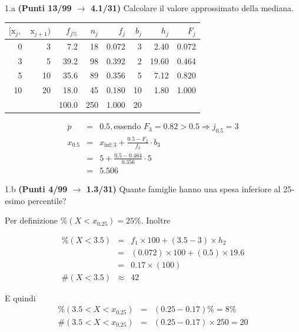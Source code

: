 \documentclass[
  11pt,
]{book}
\theoremstyle{mytheoremstyle}
\theoremstyle{mydefstyle}
\newenvironment{sol}
  {
  \begin{tcolorbox}[enhanced,breakable,arc=0.1mm,boxrule=1pt,colback=white,colframe=iblue,
  title=\bf \fontfamily{lmss}\selectfont \hspace{.5 cm} Soluzione,drop fuzzy shadow]

}{
\end{tcolorbox}
  }
\begin{document}
1.a \textbf{(Punti 13/99 \(\rightarrow\) 4.1/31)} Calcolare il valore approssimato della mediana.

\begin{sol}

\begin{table}[H]
\centering
\begin{tabular}{rrrrrrrr}
\toprule
$[\text{x}_j,$ & $\text{x}_{j+1})$ & $f_{j\%}$ & $n_j$ & $f_j$ & $b_j$ & $h_j$ & $F_j$\\
\midrule
0 & 3 & 7.2 & 18 & 0.072 & 3 & 2.40 & 0.072\\
3 & 5 & 39.2 & 98 & 0.392 & 2 & 19.60 & 0.464\\
5 & 10 & 35.6 & 89 & 0.356 & 5 & 7.12 & 0.820\\
10 & 20 & 18.0 & 45 & 0.180 & 10 & 1.80 & 1.000\\
 &  & 100.0 & 250 & 1.000 & 20 &  & \\
\bottomrule
\end{tabular}
\end{table}

\begin{eqnarray*}
  p &=&  0.5 , \text{essendo }F_{ 3 }= 0.82  > 0.5  \Rightarrow j_{ 0.5 }= 3 \\
  x_{ 0.5 } &=& x_{\text{inf}; 3 } + \frac{ { 0.5 } - F_{ 2 }} {f_{ 3 }} \cdot b_{ 3 } \\
            &=&  5  + \frac {{ 0.5 } -  0.464 } { 0.356 } \cdot  5  \\
            &=&  5.506 
\end{eqnarray*}

\end{sol}

1.b \textbf{(Punti 4/99 \(\rightarrow\) 1.3/31)} Quante famiglie hanno una spesa inferiore al 25-esimo percentile?

\begin{sol}
Per definizione \(\%(X<x_{ 0.25 })= 25 \%\). Inoltre

\begin{eqnarray*}
   \%(X< 3.5 ) &=&  f_{ 1 }\times 100 +( 3.5 - 3 )\times h_{ 2 } \\
                &=&  ( 0.072 )\times 100 +( 0.5 )\times  19.6  \\
                &=&  0.17 \times(100) \\
\#(X< 3.5 )    &\approx& 42 
\end{eqnarray*}

E quindi
\begin{eqnarray*}
   \%( 3.5 < X < x_{0.25} ) &=& ( 0.25 - 0.17 )\%= 8 \% \\
   \#( 3.5 < X < x_{0.25} ) &=& ( 0.25 - 0.17 )\times  250 = 20  \\
\end{eqnarray*}

\end{sol}
\end{document}
